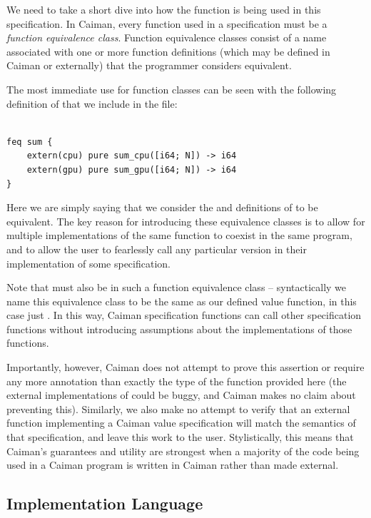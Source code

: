 We need to take a short dive into how the  function is being used in this  specification.  In Caiman, every function used in a specification must be a \textit{function equivalence class}.  Function equivalence classes consist of a name associated with one or more function definitions (which may be defined in Caiman or externally) that the programmer considers equivalent.

The most immediate use for function classes can be seen with the following definition of  that we include in the  file:
%
\begin{lstlisting}

feq sum {
    extern(cpu) pure sum_cpu([i64; N]) -> i64
    extern(gpu) pure sum_gpu([i64; N]) -> i64
}
\end{lstlisting}
%
Here we are simply saying that we consider the  and  definitions of  to be equivalent.  The key reason for introducing these equivalence classes is to allow for multiple implementations of the same function to coexist in the same program, and to allow the user to fearlessly call any particular version in their implementation of some specification.  

Note that  must also be in such a function equivalence class -- syntactically we name this equivalence class to be the same as our defined value function, in this case just .  In this way, Caiman specification functions can call other specification functions without introducing assumptions about the implementations of those functions.  

Importantly, however, Caiman does not attempt to prove this assertion or require any more annotation than exactly the type of the function provided here (the external implementations of  could be buggy, and Caiman makes no claim about preventing this).  Similarly, we also make no attempt to verify that an external function implementing a Caiman value specification will match the semantics of that specification, and leave this work to the user.  Stylistically, this means that Caiman's guarantees and utility are strongest when a majority of the code being used in a Caiman program is written in Caiman rather than made external.  

\subsection{Implementation Language}
\label{subsec:implementation}

